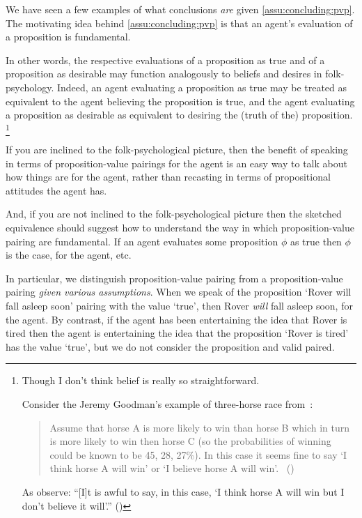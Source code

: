 \begin{note}
  We have seen a few examples of what conclusions \emph{are} given \autoref{assu:concluding:pvp}.
  The motivating idea behind \autoref{assu:concluding:pvp} is that an agent's evaluation of a proposition is fundamental.

  In other words, the respective evaluations of a proposition as true and of a proposition as desirable may function analogously to beliefs and desires in folk-psychology.
  Indeed, an agent evaluating a proposition as true may be treated as equivalent to the agent believing the proposition is true, and the agent evaluating a proposition as desirable as equivalent to desiring the (truth of the) proposition.%
  \footnote{
    \label{fn:belief-is-difficult}
    Though I don't think belief is really so straightforward.

    Consider the Jeremy Goodman's example of three-horse race from~\textcite{Hawthorne:2016wv}:
    \begin{quote}
      Assume that horse A is more likely to win than horse B which in turn is more likely to win then horse C (so the probabilities of winning could be known to be 45, 28, 27\%).
      In this case it seems ﬁne to say `I think horse A will win' or `I believe horse A will win'.%
      \mbox{ }\hfill\mbox{(\citeyear[1440]{Hawthorne:2016wv})}
    \end{quote}
    As \citeauthor{Hawthorne:2016wv} observe: ``[I]t is awful to say, in this case, `I think horse A will win but I don't believe it will'.''
    (\citeyear[1440, fn.17]{Hawthorne:2016wv})
  }

  If you are inclined to the folk-psychological picture, then the benefit of speaking in terms of proposition-value pairings for the agent is an easy way to talk about how things are for the agent, rather than recasting in terms of propositional attitudes the agent has.

  And, if you are not inclined to the folk-psychological picture then the sketched equivalence should suggest how to understand the way in which proposition-value pairing are fundamental.
  If an agent evaluates some proposition \(\phi\) as true then \(\phi\) is the case, for the agent, etc.
\end{note}

\begin{note}
  In particular, we distinguish proposition-value pairing from a proposition-value pairing \emph{given various assumptions}.
  When we speak of the proposition `Rover will fall asleep soon' pairing with the value `true', then Rover \emph{will} fall asleep soon, for the agent.
  By contrast, if the agent has been entertaining the idea that Rover is tired then the agent is entertaining the idea that the proposition `Rover is tired' has the value `true', but we do not consider the proposition and valid paired.
\end{note}

